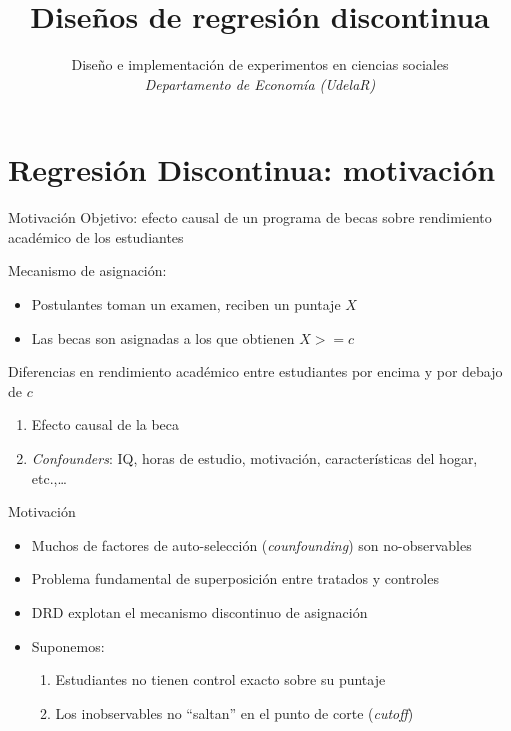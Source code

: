 \documentclass[
  ignorenonframetext,
]{beamer}
\title{Diseños de regresión discontinua}
\author{Diseño e implementación de experimentos en ciencias sociales\\
\emph{Departamento de Economía (UdelaR)}}
\date{}
\providecommand{\tightlist}{%
  \setlength{\itemsep}{0pt}\setlength{\parskip}{0pt}}
\begin{document}
\frame{\titlepage}

\hypertarget{regresiuxf3n-discontinua-motivaciuxf3n}{%
\section{Regresión Discontinua:
motivación}\label{regresiuxf3n-discontinua-motivaciuxf3n}}

\begin{frame}{Motivación}
\protect\hypertarget{motivaciuxf3n}{}
Objetivo: efecto causal de un programa de becas sobre rendimiento
académico de los estudiantes

Mecanismo de asignación:

\begin{itemize}
\tightlist
\item
  Postulantes toman un examen, reciben un puntaje \(X\)
\item
  Las becas son asignadas a los que obtienen \(X>=c\)
\end{itemize}

Diferencias en rendimiento académico entre estudiantes por encima y por
debajo de \(c\)

\begin{enumerate}
\tightlist
\item
  Efecto causal de la beca
\item
  \emph{Confounders}: IQ, horas de estudio, motivación, características
  del hogar, etc.,\ldots{}
\end{enumerate}
\end{frame}

\begin{frame}{Motivación}
\protect\hypertarget{motivaciuxf3n-1}{}
\begin{itemize}
\item
  Muchos de factores de auto-selección (\emph{counfounding}) son
  no-observables
\item
  Problema fundamental de superposición entre tratados y controles
\item
  DRD explotan el mecanismo discontinuo de asignación
\item
  Suponemos:

  \begin{enumerate}
  \tightlist
  \item
    Estudiantes no tienen control exacto sobre su puntaje
  \item
    Los inobservables no ``saltan'' en el punto de corte (\emph{cutoff})
  \end{enumerate}
\end{itemize}
\end{frame}
\end{document}
